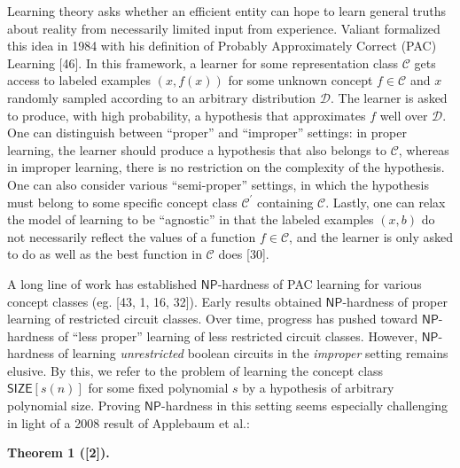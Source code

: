 \documentclass[10pt,a4paper]{article}
\begin{document}
Learning theory asks whether an efficient entity can hope to learn general truths about reality from necessarily limited input from experience. Valiant formalized this idea in 1984 with his definition of Probably Approximately Correct (PAC) Learning [46]. In this framework, a learner for some representation class $\mathcal{C}$ gets access to labeled examples $(x,f(x))$ for some unknown concept $f\in\mathcal{C}$ and $x$ randomly sampled according to an arbitrary distribution $\mathcal{D}$. The learner is asked to produce, with high probability, a hypothesis that approximates $f$ well over $\mathcal{D}$. One can distinguish between “proper” and “improper” settings: in proper learning, the learner should produce a hypothesis that also belongs to $\mathcal{C}$, whereas in improper learning, there is no restriction on the complexity of the hypothesis. One can also consider various “semi-proper” settings, in which the hypothesis must belong to some specific concept class $\mathcal{C^{\prime}}$ containing $\mathcal{C}$. Lastly, one can relax the model of learning to be “agnostic” in that the labeled examples $(x,b)$ do not necessarily reflect the values of a function $f\in\mathcal{C}$, and the learner is only asked to do as well as the best function in $\mathcal{C}$ does [30].\par




A long line of work has established ${\mathsf{NP}}$-hardness of PAC learning for various concept classes (eg. [43, 1, 16, 32]). Early results obtained ${\mathsf{NP}}$-hardness of proper learning of restricted circuit classes. Over time, progress has pushed toward ${\mathsf{NP}}$-hardness of “less proper” learning of less restricted circuit classes. However, ${\mathsf{NP}}$-hardness of learning \emph{unrestricted} boolean circuits in the \emph{improper} setting remains elusive. By this, we refer to the problem of learning the concept class ${\mathsf{SIZE}}[s(n)]$ for some fixed polynomial $s$ by a hypothesis of arbitrary polynomial size. Proving ${\mathsf{NP}}$-hardness in this setting seems especially challenging in light of a 2008 result of Applebaum et al.:\par





\par\medskip\noindent\textbf{
\textbf{Theorem 1}\textbf{ }([2])\textbf{.}
}\par
\end{document}
